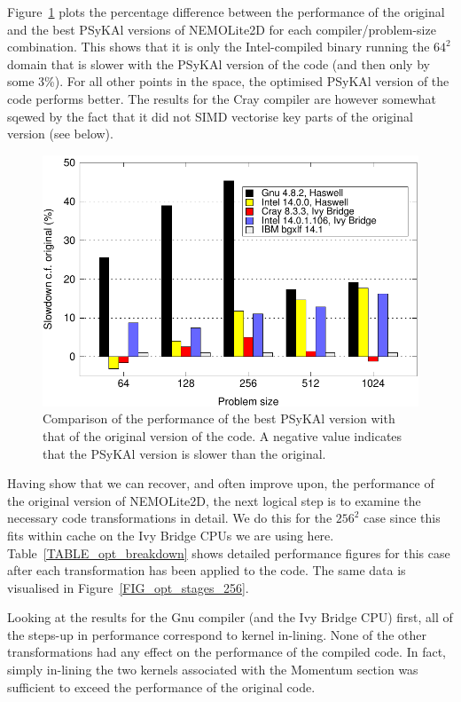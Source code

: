 \documentclass[gmdd, manuscript]{copernicus}
\newlength{\picwidth}
\begin{document}
Figure~\ref{FIG_slowdown_summary} plots the percentage difference
between the performance of the original and the best {PS}y{KA}l versions
of NEMOLite2D for each compiler/problem-size combination. This shows that it is
only the Intel-compiled binary running the $64^2$ domain that is
slower with the {PS}y{KA}l version of the code (and then only by some
3\%). For all other points in the space, the optimised {PS}y{KA}l version
of the code performs better. The results for the Cray compiler are
however somewhat sqewed by the fact that it did not SIMD vectorise key
parts of the original version (see below).

\begin{figure}[!t]
\centering
\includegraphics[width=\picwidth]{slowdown_summary}
\caption{Comparison of the performance of the best {PS}y{KA}l
version with that of the original version of the code. A negative value 
indicates that the {PS}y{KA}l version is slower than the original.}
\label{FIG_slowdown_summary}
\end{figure}

Having show that we can recover, and often improve upon, the
performance of the original version of NEMOLite2D, the next logical
step is to examine the necessary code transformations in detail.  We
do this for the $256^{2}$ case since this fits within cache on the Ivy
Bridge CPUs we are using here.  Table~\ref{TABLE_opt_breakdown} shows
detailed performance figures for this case after each transformation
has been applied to the code. The same data is visualised in
Figure~\ref{FIG_opt_stages_256}.

Looking at the results for the Gnu compiler (and the Ivy Bridge CPU)
first, all of the steps-up in performance correspond to kernel
in-lining. None of the other transformations had any effect on the
performance of the compiled code. In fact, simply in-lining the two
kernels associated with the Momentum section was sufficient to exceed
the performance of the original code.
\end{document}
